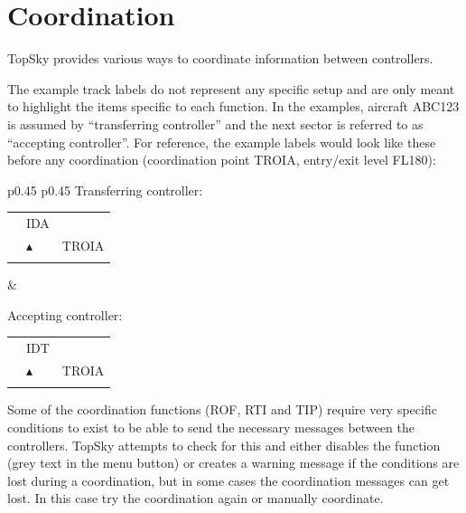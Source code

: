 \documentclass[a4paper,oneside,11pt]{memoir}
\begin{document}
\section{Coordination}

TopSky provides various ways to coordinate information between controllers.

\bigskip

The example track labels do not represent any specific setup and are only meant to highlight the items specific to each function. In the examples, aircraft ABC123 is assumed by “transferring controller” and the next sector is referred to as “accepting controller”. For reference, the example labels would look like these before any coordination (coordination point TROIA, entry/exit level FL180):

\bigskip

\begin{longtable}{p{} p{}}
  Transferring controller:

  \begin{tabular}{
    >{\columncolor{Flight Highlight}}l 
    >{\columncolor{Flight Highlight}}l
    >{\columncolor{Flight Highlight}}l }
    {\color{Assumed} ABC123} & {\color{Coordination} IDA}       & {\color{Assumed} }      \\
    {\color{Assumed} 100}    & {\color{Assumed} $\blacktriangle$} & {\color{Assumed} TROIA} \\
    {\color{Assumed} 180}    & {\color{Assumed} }          & {\color{Assumed} }     
  \end{tabular}
  &

  Accepting controller:

  \begin{tabular}{
    >{\columncolor{Flight Highlight}}l 
    >{\columncolor{Flight Highlight}}l
    >{\columncolor{Flight Highlight}}l }
    {\color{Coordination} ABC123} & {\color{Coordination} IDT}       & {\color{Coordination} }      \\
    {\color{Coordination} 100}    & {\color{Coordination} $\blacktriangle$} & {\color{Coordination} TROIA} \\
    {\color{Coordination} 180}    & {\color{Coordination} }          & {\color{Coordination} }     
  \end{tabular}
  \end{longtable}

\bigskip

Some of the coordination functions (ROF, RTI and TIP) require very specific conditions to exist to be able to send the necessary messages between the controllers. TopSky attempts to check for this and either disables the function (grey text in the menu button) or creates a warning message if the conditions are lost during a coordination, but in some cases the coordination messages can get lost. In this case try the coordination again or manually coordinate.
\end{document}

